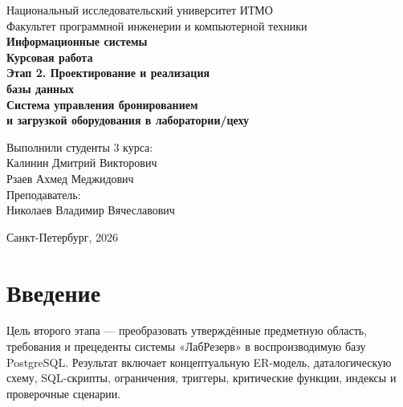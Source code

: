 \documentclass[12pt,a4paper]{article}
\newcommand{\systemname}{«ЛабРезерв»}
\begin{document}
\hypersetup{pageanchor=false}

\begin{titlepage}
\begin{center}
    \large
    Национальный исследовательский университет ИТМО\\
    Факультет программной инженерии и компьютерной техники\\
    \vspace{2.5cm}
    \textbf{\Large Информационные системы}\\
    \vspace{0.5cm}
    \textbf{\Large Курсовая работа}\\
    \vspace{0.35cm}
    \textbf{\large Этап 2. Проектирование и реализация\\базы данных}\\
    \vspace{0.8cm}
    \textbf{\Large Система управления бронированием\\
    и загрузкой оборудования в лаборатории/цеху}\\
    \vspace{2.4cm}
    \begin{flushright}
        Выполнили студенты 3 курса:\\
        Калинин Дмитрий Викторович\\
        Рзаев Ахмед Меджидович\\
        \vspace{0.6cm}
        Преподаватель:\\
        Николаев Владимир Вячеславович
    \end{flushright}
    \vfill
    Санкт-Петербург, 2026
\end{center}
\end{titlepage}

\clearpage
\hypersetup{pageanchor=true}
\begin{singlespace}
\tableofcontents
\end{singlespace}
\newpage
{}

\section{Введение}

Цель второго этапа --- преобразовать утверждённые предметную область, требования
и прецеденты системы \systemname{} в воспроизводимую базу PostgreSQL.
Результат включает концептуальную ER-модель, даталогическую схему, SQL-скрипты,
ограничения, триггеры, критические функции, индексы и проверочные сценарии.
\end{document}
